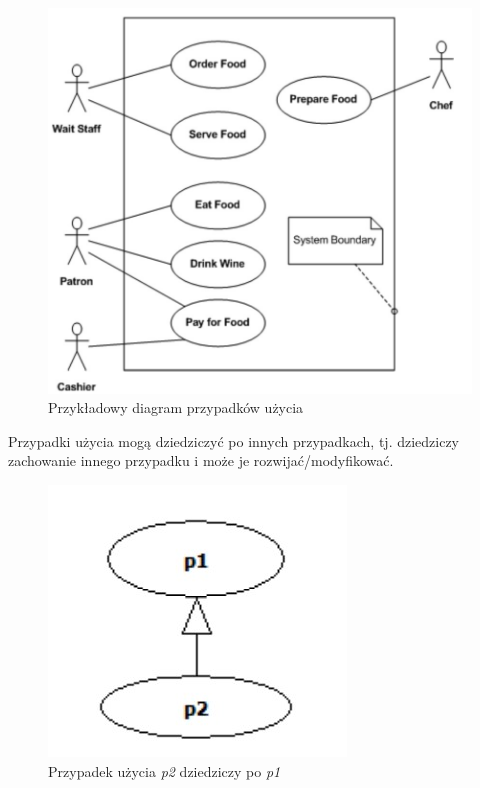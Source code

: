 \documentclass[a4paper,12pt,oneside]{book}
\begin{document}
                \begin{figure}[h]
                    \centering
                    \includegraphics[width=\textwidth/2]{images/use_case.jpg}
                    \caption{Przykładowy diagram przypadków użycia}
                    \label{fig:twojastara30}
                \end{figure}
                Przypadki użycia mogą dziedziczyć po innych przypadkach, tj. dziedziczy zachowanie innego przypadku i może je rozwijać/modyfikować.
                \begin{figure}[h]
                    \centering
                    \includegraphics[width=\textwidth/3]{images/uc_dziedziczenie.jpg}
                    \caption{Przypadek użycia \textit{p2} dziedziczy po \textit{p1}}
                    \label{fig:twojastara31}
                \end{figure}
\end{document}
